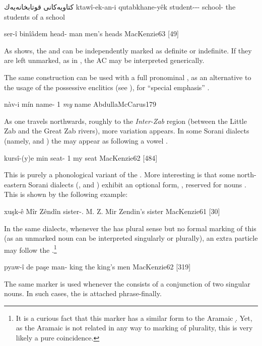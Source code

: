 {كتاویەكانی قوتابخانەیەك}
{ktawî-ek-an-i qutabkhane-yêk}
{student--\pl-\ez{} school-\indef}
{the students of a school}
{\citep[10]{ThackstonSorani}}

{ser-î binîâdem}
{head-\ez{} man}
{men's heads}
{MacKenzie}{63 {[49]}}

As  shows, the \prim and \secn can be independently marked as definite or indefinite. If they are left unmarked, as in , the AC may be interpreted generically.

The same construction can be used with a full pronominal \secn, as an alternative to the usage of the possessive enclitics (see ), for \enquote{special emphasis} \citep[179]{AbdullaMcCarus}.

{nàv-i mín}
{name-\ez{} 1\sg}
{\textit{my} name}
{AbdullaMcCarus}{179}


As one travels northwards, roughly to the \emph{Inter-Zab} region (between the Little Zab and the Great Zab rivers), more variation appears. In some Sorani dialects (namely, \Muk and \Rdz) the \ez* may appear as  following a vowel \citep[62]{MacKenzie}. 

{kursî-(y)e min}
	{seat-\ez{} 1\sg}
{my seat}
{MacKenzie}{62 {[484]}}

 This is purely a phonological variant of the \ez*. More interesting  is that some north-eastern Sorani dialects (\Bin, \Piz and \Muk) exhibit an optional \ez* form, , reserved for \fem* \sg* nouns \citep[61]{MacKenzie}. This is shown by the following example:
 
 {xuşk-ê Mîr Zêndîn}
 {sister-\ez.\fem{} M. Z.}
 {Mir Zendin's sister}
 {MacKenzie}{61 {[30]}}
 
  In the same dialects, whenever the \prim has plural sense but no formal marking of this (as an unmarked noun can be interpreted singularly or plurally), an extra particle  may follow the \ez*.\footnote{It is a curious fact that this \pl* \ez* marker has a  similar form to the Aramaic \lnk* \d. Yet, as the Aramaic \lnk* is not related in any way to marking of plurality, this is very likely a pure coincidence.}
  
  {pyaw-î de paşe}
  {man-\ez{} \pl{} king}
  {the king's men}
  {MacKenzie}{62 {[319]}}
  
  The same marker is used whenever the \prim consists of a conjunction of two singular nouns. In such cases, the \ez* is attached phrase-finally. 
  
